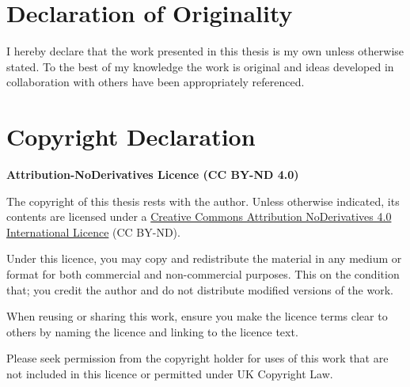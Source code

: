 \cleardoublepage{}
{}\mtcaddchapter 
\chapter*{Declaration of Originality}
\addtocounter{counter}{-1}




I hereby declare that the work presented in this thesis is my own unless otherwise stated. To the best of my knowledge the work is original and ideas developed in collaboration with others have been appropriately referenced.


\cleardoublepage{}
{}\mtcaddchapter 
\chapter*{Copyright Declaration}
\addtocounter{counter}{-1}


\textbf{Attribution-NoDerivatives Licence (CC BY-ND 4.0)}

The copyright of this thesis rests with the author. Unless otherwise indicated, its contents are licensed under a \href{https://creativecommons.org/licenses/by-nd/4.0/}{Creative Commons Attribution NoDerivatives 4.0 International Licence}  (CC BY-ND).

Under this licence, you may copy and redistribute the material in any medium or format for both commercial and non-commercial purposes.  This on the condition that; you credit the author and do not distribute modified versions of the work.

When reusing or sharing this work, ensure you make the licence terms clear to others by naming the licence and linking to the licence text.

Please seek permission from the copyright holder for uses of this work that are not included in this licence or permitted under UK Copyright Law.

